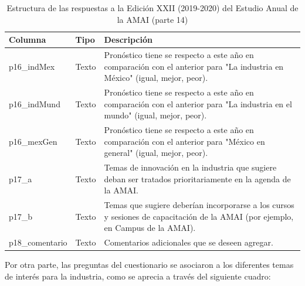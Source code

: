 \begin{table}[]
\caption{Estructura de las respuestas a la Edición XXII (2019-2020) del Estudio Anual de la AMAI (parte 14)}
\label{tab:raw2019_14}
\begin{tabular}{|l|l|l|}
\hline
Columna         & Tipo  & Descripción                                                                                           \\ \hline
p16\_indMex  & Texto & \parbox[t]{8cm}{Pronóstico tiene se respecto a este año en comparación con el anterior para "La industria en México" (igual, mejor, peor). \vspace{0.1cm}}                  \\ \hline
p16\_indMund & Texto & \parbox[t]{8cm}{Pronóstico tiene se respecto a este año en comparación con el anterior para "La industria en el mundo" (igual, mejor, peor). \vspace{0.1cm}}                \\ \hline
p16\_mexGen     & Texto & \parbox[t]{8cm}{Pronóstico tiene se respecto a este año en comparación con el anterior para "México en general" (igual, mejor, peor). \vspace{0.1cm}}      \\ \hline
p17\_a          & Texto & \parbox[t]{8cm}{Temas de innovación en la industria que sugiere deban ser tratados prioritariamente en la agenda de la AMAI. \vspace{0.1cm}} \\ \hline
p17\_b       & Texto & \parbox[t]{8cm}{Temas que sugiere deberían incorporarse a los cursos y sesiones de capacitación de la AMAI (por ejemplo, en Campus de la AMAI). \vspace{0.1cm}} \\ \hline
p18\_comentario & Texto & \parbox[t]{8cm}{Comentarios adicionales que se deseen agregar. \vspace{0.1cm}}                                                         \\ \hline
\end{tabular}
\end{table}

Por otra parte, las preguntas del cuestionario se asociaron a los diferentes temas de interés para la industria, como se aprecia a través del siguiente cuadro:

